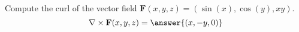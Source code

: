 \begin{problem}
Compute the curl of the vector field $\mathbf{F}(x,y,z) = (\sin(x),\cos(y),xy)$.
\[
\nabla\times\mathbf{F}(x,y,z) = \answer{(x,-y,0)}
\]
\end{problem}
